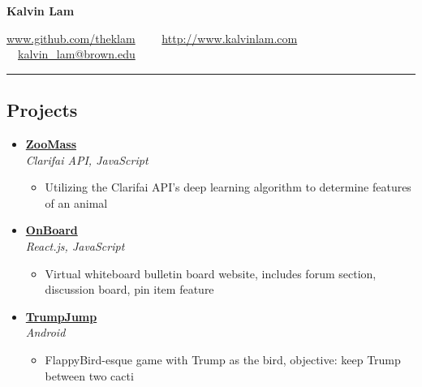 \documentclass[10pt,letterpaper]{article}
\begin{document}
\begin{center}
{\huge \textbf{Kalvin Lam}}


\href{http://www.github.com/theklam/}{www.github.com/theklam}\ \ \textbullet
\ \ \href{http://www.kalvinlam.com}{http://www.kalvinlam.com}\ \ \textbullet
\ \ \href{malto:kalvin_lam@brown.edu}{kalvin\_lam@brown.edu}

\end{center}

\hrule
\vspace{-1.0em}
\subsection*{Projects}
  \begin{itemize}
    \parskip=-0.5em
    \item[]
    {\href{http://www.twitter.com}{\textbf{ZooMass}} \hfill
      \textbf{}}
    \\
    {\emph{Clarifai API, JavaScript} \hfill \emph{}}

    \begin{itemize}[label=\textbullet]
      \itemsep0em
      \item Utilizing the Clarifai API's deep learning algorithm to determine features of an animal
    \end{itemize}
     \item[]
    {\href{http://www.twitter.com}{\textbf{OnBoard}} \hfill
      \textbf{}}
    \\
    {\emph{React.js, JavaScript} \hfill \emph{}}

    \begin{itemize}[label=\textbullet]
      \itemsep0em
      \item Virtual whiteboard bulletin board website, includes forum section,
discussion board, pin item feature
    \end{itemize}
     \item[]
    {\href{http://www.twitter.com}{\textbf{TrumpJump}} \hfill
      \textbf{}}
    \\
    {\emph{Android} \hfill \emph{}}

    \begin{itemize}[label=\textbullet]
      \itemsep0em
      \item FlappyBird-esque game with Trump as the bird, objective: keep Trump
between two cacti
    \end{itemize}
    
\end{itemize}
\end{document}
